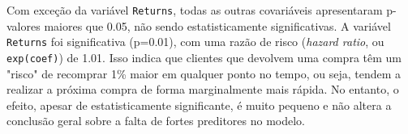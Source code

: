 Com exceção da variável \texttt{Returns}, todas as outras covariáveis apresentaram p-valores maiores que 0.05, não sendo estatisticamente significativas. A variável \texttt{Returns} foi significativa (p=0.01), com uma razão de risco (\textit{hazard ratio}, ou \texttt{exp(coef)}) de 1.01. Isso indica que clientes que devolvem uma compra têm um "risco" de recomprar 1\% maior em qualquer ponto no tempo, ou seja, tendem a realizar a próxima compra de forma marginalmente mais rápida. No entanto, o efeito, apesar de estatisticamente significante, é muito pequeno e não altera a conclusão geral sobre a falta de fortes preditores no modelo.

